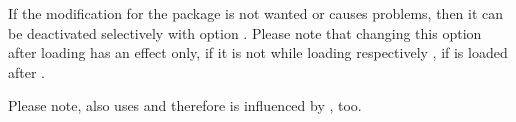 If the modification for the package is not wanted or causes problems,
then it can be deactivated selectively with option
.
Please note that changing this option after loading
 has an effect only, if it is not  while
loading  respectively , if
 is loaded after .

Please note,
 also uses
 and therefore is influenced by , too.%
%



\endinput

